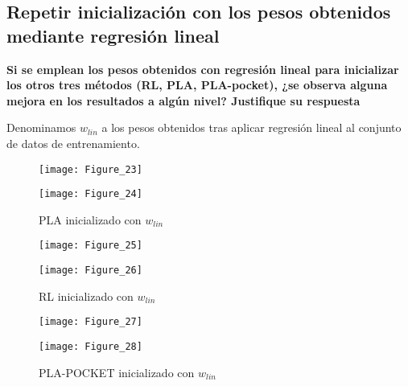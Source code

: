 \subsection{Repetir inicialización con los pesos obtenidos mediante regresión lineal}

\textbf{Si se emplean los pesos obtenidos con regresión lineal para inicializar
los otros tres métodos (RL, PLA, PLA-pocket), ¿se observa alguna mejora en
los resultados a algún nivel? Justifique su respuesta}

Denominamos $w_{lin}$ a los pesos obtenidos tras aplicar regresión lineal al conjunto
de datos de entrenamiento.

\begin{figure}[H]
    \caption{PLA inicializado con $w_{lin}$ \medskip}
    \begin{minipage}[b]{.5\linewidth}
      \centering
      \texttt{[image: Figure\_23]}
       \label{subfig-5:dummy66}
    \end{minipage}
    \hfill \hfill
    \begin{minipage}[b]{.5\linewidth}
      \centering
      \texttt{[image: Figure\_24]}
    \end{minipage}
    \label{fig:dummy66}
\end{figure}

\begin{figure}[H]
    \caption{RL inicializado con $w_{lin}$ \medskip}
    \begin{minipage}[b]{.5\linewidth}
      \centering
      \texttt{[image: Figure\_25]}
       \label{subfig-5:dummy67}
    \end{minipage}
    \hfill \hfill
    \begin{minipage}[b]{.5\linewidth}
      \centering
      \texttt{[image: Figure\_26]}
    \end{minipage}
    \label{fig:dummy67}
\end{figure}


\begin{figure}[H]
    \caption{PLA-POCKET inicializado con $w_{lin}$ \medskip}
    \begin{minipage}[b]{.5\linewidth}
      \centering
      \texttt{[image: Figure\_27]}
       \label{subfig-5:dummy68}
    \end{minipage}
    \hfill \hfill
    \begin{minipage}[b]{.5\linewidth}
      \centering
      \texttt{[image: Figure\_28]}
    \end{minipage}
    \label{fig:dummy68}
\end{figure}

